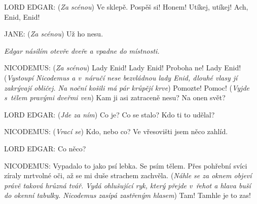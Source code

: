 \noindent
LORD EDGAR: (\textit{Za scénou}) Ve sklepě. Pospěš si! Honem! Utíkej, utíkej! Ach, Enid, Enid!

\noindent
JANE: (\textit{Za scénou}) Už ho nesu.

\smallskip

\noindent
\textit{Edgar násilím otevře dveře a vpadne do místnosti.}

\smallskip

\noindent
NICODEMUS: (\textit{Za scénou}) Lady Enid! Lady Enid! Proboha ne! Lady Enid! (\textit{Vystoupí Nicodemus a v náručí nese bezvládnou lady Enid, dlouhé vlasy jí zakrývají obličej. Na noční košili má pár krůpějí krve}) Pomozte! Pomoc! (\textit{Vyjde s tělem pravými dveřmi ven}) Kam ji asi zatraceně nesu? Na onen svět?

\noindent
LORD EDGAR: (\textit{Jde za ním}) Co je? Co se stalo? Kdo ti to udělal?

\noindent
NICODEMUS: (\textit{Vrací se}) Kdo, nebo co? Ve vřesovišti jsem něco zahlíd.

\noindent
LORD EDGAR: Co něco?

\noindent
NICODEMUS: Vypadalo to jako psí lebka. Se psím tělem. Přes pohřební svíci zíraly mrtvolné oči, až se mi duše strachem zachvěla. (\textit{Náhle se za oknem objeví právě taková hrůzná tvář. Vydá ohlušující ryk, který přejde v řehot a hlava buší do okenní tabulky. Nicodemus zasípá zastřeným hlasem}) Tam! Tamhle je to zas!

